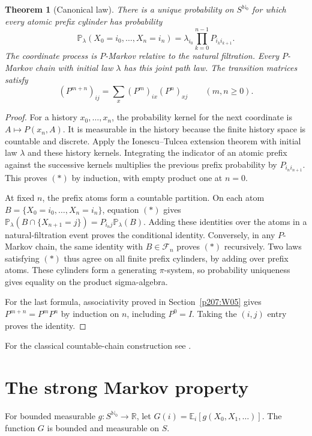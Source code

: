 \documentclass[11pt,oneside,openany]{book}
\theoremstyle{plain}
\newtheorem{theorem}{Theorem}[chapter]
\theoremstyle{definition}
\theoremstyle{remark}
\begin{document}
\begin{theorem}[Canonical law]
There is a unique probability on \(S^{\mathbb N_0}\) for which every
atomic prefix cylinder has probability
\[
 \mathbb P_\lambda(X_0=i_0,\ldots,X_n=i_n)
    =\lambda_{i_0}\prod_{k=0}^{n-1}P_{i_k i_{k+1}}.
 \tag{*}
\]
The coordinate process is \(P\)-Markov relative to the natural
filtration. Every \(P\)-Markov chain with initial law \(\lambda\) has
this joint path law. The transition matrices satisfy
\[
 (P^{m+n})_{ij}=\sum_x(P^m)_{ix}(P^n)_{xj}
 \qquad (m,n\ge0).
\]
\end{theorem}
\begin{proof}
For a history \(x_0,\ldots,x_n\), the probability kernel for the next
coordinate is \(A\mapsto P(x_n,A)\). It is measurable in the history
because the finite history space is countable and discrete.
Apply the Ionescu--Tulcea extension theorem
\cite[Theorem \texttt{thm:ionescu-tulcea}]{P105} with initial law
\(\lambda\) and these history kernels.
Integrating the indicator of an atomic prefix against the successive
kernels multiplies the previous prefix probability by \(P_{i_n i_{n+1}}\).
This proves \((*)\) by induction, with empty product one at \(n=0\).

At fixed \(n\), the prefix atoms form a countable partition. On each
atom \(B=\{X_0=i_0,\ldots,X_n=i_n\}\), equation \((*)\) gives
\(\mathbb P_\lambda(B\cap\{X_{n+1}=j\})
 =P_{i_nj}\mathbb P_\lambda(B)\). Adding these identities over the
atoms in a natural-filtration event proves the conditional identity.
Conversely, in any \(P\)-Markov chain, the same identity with
\(B\in\mathcal F_n\) proves \((*)\) recursively. Two laws satisfying
\((*)\) thus agree on all finite prefix cylinders, by adding over
prefix atoms. These cylinders form a generating \(\pi\)-system, so
probability uniqueness gives equality on the product sigma-algebra.

For the last formula, associativity proved in
Section~\ref{p207:W05} gives \(P^{m+n}=P^mP^n\) by induction on \(n\),
including \(P^0=I\). Taking the \((i,j)\) entry proves the identity.
\end{proof}

For the classical countable-chain construction see
\cite[Section 1.1]{Norris}.

\section{The strong Markov property}\label{p207:W07}

For bounded measurable \(g:S^{\mathbb N_0}\to\mathbb R\), let
\(G(i)=\mathbb E_i[g(X_0,X_1,\ldots)]\). The function \(G\) is bounded
and measurable on \(S\).
\end{document}
